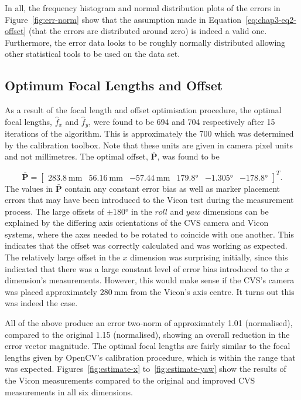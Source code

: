In all, the frequency histogram and normal distribution plots of the errors in Figure~\ref{fig:err-norm} show that the assumption made in Equation~\ref{eq:chap3-eq2-offset} (that the errors are distributed around zero) is indeed a valid one. Furthermore, the error data looks to be roughly normally distributed allowing other statistical tools to be used on the data set. 

\subsection{Optimum Focal Lengths and Offset}

As a result of the focal length and offset optimisation procedure, the optimal focal lengths, $\hat{f}_x$ and $\hat{f}_y$, were found to be 694 and 704 respectively after 15 iterations of the algorithm. This is approximately the 700 which was determined by the calibration toolbox. Note that these units are given in camera pixel units and not millimetres. The optimal offset, $\bar{\bm{P}}$, was found to be 

\begin{equation}
  \label{eq:chap3-offset-value}
  \bar{\bm{P}} = 
  \begin{bmatrix}
    \SI{283.8}{\mm} & \SI{56.16}{\mm} & \SI{-57.44}{\mm} & \ang{179.8} & \ang{-1.305} & \ang{-178.8}
  \end{bmatrix}^T.
\end{equation}
The values in $\bar{\bm{P}}$ contain any constant error bias as well as marker placement errors that may have been introduced to the Vicon test during the measurement process. The large offsets of $\pm\ang{180}$ in the $roll$ and $yaw$ dimensions can be explained by the differing axis orientations of the CVS camera and Vicon systems, where the axes needed to be rotated to coincide with one another. This indicates that the offset was correctly calculated and was working as expected. The relatively large offset in the $x$ dimension was surprising initially, since this indicated that there was a large constant level of error bias introduced to the $x$ dimension's measurements. However, this would make sense if the CVS's camera was placed approximately $\SI{280}{\mm}$ from the Vicon's axis centre. It turns out this was indeed the case. 

All of the above produce an error two-norm of approximately 1.01 (normalised), compared to the original 1.15 (normalised), showing an overall reduction in the error vector magnitude. The optimal focal lengths are fairly similar to the focal lengths given by OpenCV's calibration procedure, which is within the range that was expected. Figures~\ref{fig:estimate-x} to~\ref{fig:estimate-yaw} show the results of the Vicon measurements compared to the original and improved CVS measurements in all six dimensions.

